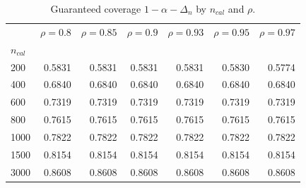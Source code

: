 \begin{table}[htbp]
\centering
\caption{Guaranteed coverage $1-\alpha-\Delta_n$ by $n_{cal}$ and $\rho$.}
\label{tab:practitioner_guide}
\footnotesize
\begin{tabular}{lrrrrrr}
\toprule
 & $\rho=0.8$ & $\rho=0.85$ & $\rho=0.9$ & $\rho=0.93$ & $\rho=0.95$ & $\rho=0.97$ \\
$n_{cal}$ &  &  &  &  &  &  \\
\midrule
200 & 0.5831 & 0.5831 & 0.5831 & 0.5831 & 0.5830 & 0.5774 \\
400 & 0.6840 & 0.6840 & 0.6840 & 0.6840 & 0.6840 & 0.6840 \\
600 & 0.7319 & 0.7319 & 0.7319 & 0.7319 & 0.7319 & 0.7319 \\
800 & 0.7615 & 0.7615 & 0.7615 & 0.7615 & 0.7615 & 0.7615 \\
1000 & 0.7822 & 0.7822 & 0.7822 & 0.7822 & 0.7822 & 0.7822 \\
1500 & 0.8154 & 0.8154 & 0.8154 & 0.8154 & 0.8154 & 0.8154 \\
3000 & 0.8608 & 0.8608 & 0.8608 & 0.8608 & 0.8608 & 0.8608 \\
\bottomrule
\end{tabular}
\end{table}
